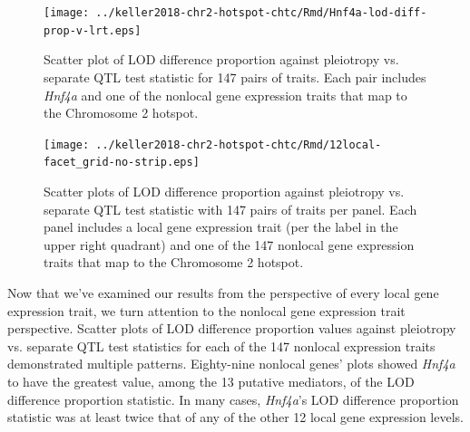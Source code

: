 \documentclass[oneside]{book}\usepackage[]{graphicx}\usepackage[]{color}
\begin{document}
\begin{figure}
    \centering
    \texttt{[image: ../keller2018-chr2-hotspot-chtc/Rmd/Hnf4a-lod-diff-prop-v-lrt.eps]}
    \caption[LOD difference proportion vs. pleiotropy test statistic.]{Scatter plot of LOD difference proportion against pleiotropy vs. 
    separate QTL test statistic for 147 pairs of traits. 
    Each pair includes \emph{Hnf4a} and one of the nonlocal gene expression traits that map to the Chromosome 2 hotspot.}
    \label{fig:hnf4a}
\end{figure}

\begin{figure}
    \centering
    \texttt{[image: ../keller2018-chr2-hotspot-chtc/Rmd/12local-facet\_grid-no-strip.eps]}
    \caption[LOD difference proportion vs. pleiotropy test statistic from the per-local gene perspective.]{Scatter plots of LOD difference proportion against pleiotropy vs. separate QTL
    test statistic with 147 pairs of traits per panel. 
    Each panel includes a local gene expression trait 
    (per the label in the upper right quadrant) and one of the 147 nonlocal gene 
    expression traits that map to the Chromosome 2 hotspot.}
    \label{fig:nothnf4a-12}
\end{figure}








Now that we've examined our results from the perspective of every local gene expression trait,
we turn attention to the nonlocal gene expression trait perspective. 
Scatter plots of LOD difference proportion values against pleiotropy vs. separate QTL test
statistics for each of the 147 nonlocal expression traits demonstrated multiple patterns. 
Eighty-nine nonlocal genes' plots showed \emph{Hnf4a} to have the greatest value, among the 13 putative mediators, of the LOD difference proportion statistic. 
In many cases, \emph{Hnf4a}'s LOD difference proportion statistic was at 
least twice that of any of the other 12 local gene expression levels.
\end{document}
